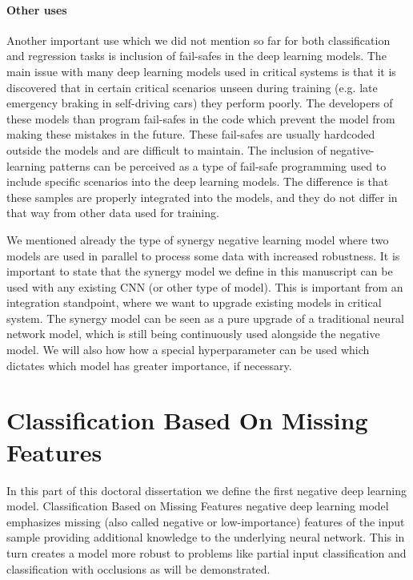 \documentclass[b5paper]{book}
\begin{document}
\subsection{Other uses}

Another important use which we did not mention so far for both classification and regression tasks is inclusion of fail-safes in the deep learning models. The main issue with many deep learning models used in critical systems is that it is discovered that in certain critical scenarios unseen during training (e.g. late emergency braking in self-driving cars) they perform poorly. The developers of these models than program fail-safes in the code which prevent the model from making these mistakes in the future. These fail-safes are usually hardcoded outside the models and are difficult to maintain. The inclusion of negative-learning patterns can be perceived as a type of fail-safe programming used to include specific scenarios into the deep learning models. The difference is that these samples are properly integrated into the models, and they do not differ in that way from other data used for training.

We mentioned already the type of synergy negative learning model where two models are used in parallel to process some data with increased robustness. It is important to state that the synergy model we define in this manuscript can be used with any existing CNN (or other type of model). This is important from an integration standpoint, where we want to upgrade existing models in critical system. The synergy model can be seen as a pure upgrade of a traditional neural network model, which is still being continuously used alongside the negative model. We will also how how a special hyperparameter can be used which dictates which model has greater importance, if necessary.

\part{Classification Based On Missing Features}

In this part of this doctoral dissertation we define the first negative deep learning model. Classification Based on Missing Features negative deep learning model emphasizes missing (also called negative or low-importance) features of the input sample providing additional knowledge to the underlying neural network. This in turn creates a model more robust to problems like partial input classification and classification with occlusions as will be demonstrated.
\end{document}
